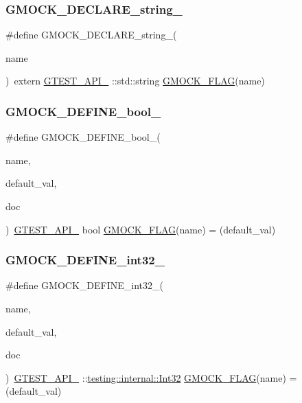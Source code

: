 \subsubsection{\texorpdfstring{GMOCK\_DECLARE\_string\_}{GMOCK\_DECLARE\_string\_}}
{\footnotesize\ttfamily \#define G\+M\+O\+C\+K\+\_\+\+D\+E\+C\+L\+A\+R\+E\+\_\+string\+\_\+(\begin{DoxyParamCaption}\item[{}]{name }\end{DoxyParamCaption})~extern \mbox{\hyperlink{gtest-port_8h_aa73be6f0ba4a7456180a94904ce17790}{G\+T\+E\+S\+T\+\_\+\+A\+P\+I\+\_\+}} \+::std\+::string \mbox{\hyperlink{gmock-port_8h_ad7119adfef06be5e7b1551633f5a1436}{G\+M\+O\+C\+K\+\_\+\+F\+L\+AG}}(name)}

\mbox{\label{gmock-port_8h_a470be328fabbeef3987127adc18a1433}} 
\subsubsection{\texorpdfstring{GMOCK\_DEFINE\_bool\_}{GMOCK\_DEFINE\_bool\_}}
{\footnotesize\ttfamily \#define G\+M\+O\+C\+K\+\_\+\+D\+E\+F\+I\+N\+E\+\_\+bool\+\_\+(\begin{DoxyParamCaption}\item[{}]{name,  }\item[{}]{default\+\_\+val,  }\item[{}]{doc }\end{DoxyParamCaption})~\mbox{\hyperlink{gtest-port_8h_aa73be6f0ba4a7456180a94904ce17790}{G\+T\+E\+S\+T\+\_\+\+A\+P\+I\+\_\+}} bool \mbox{\hyperlink{gmock-port_8h_ad7119adfef06be5e7b1551633f5a1436}{G\+M\+O\+C\+K\+\_\+\+F\+L\+AG}}(name) = (default\+\_\+val)}

\mbox{\label{gmock-port_8h_a19d91081ff0aaab2f60ef1dc2d6e6b34}} 
\subsubsection{\texorpdfstring{GMOCK\_DEFINE\_int32\_}{GMOCK\_DEFINE\_int32\_}}
{\footnotesize\ttfamily \#define G\+M\+O\+C\+K\+\_\+\+D\+E\+F\+I\+N\+E\+\_\+int32\+\_\+(\begin{DoxyParamCaption}\item[{}]{name,  }\item[{}]{default\+\_\+val,  }\item[{}]{doc }\end{DoxyParamCaption})~\mbox{\hyperlink{gtest-port_8h_aa73be6f0ba4a7456180a94904ce17790}{G\+T\+E\+S\+T\+\_\+\+A\+P\+I\+\_\+}} \+::\mbox{\hyperlink{namespacetesting_1_1internal_a8ee38faaf875f133358abaf9bc056cec}{testing\+::internal\+::\+Int32}} \mbox{\hyperlink{gmock-port_8h_ad7119adfef06be5e7b1551633f5a1436}{G\+M\+O\+C\+K\+\_\+\+F\+L\+AG}}(name) = (default\+\_\+val)}

